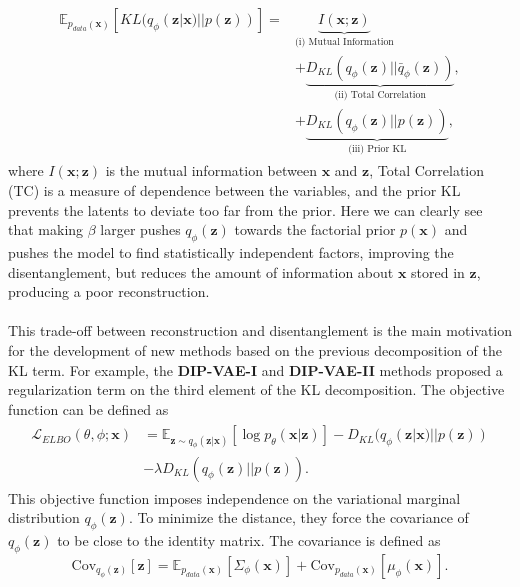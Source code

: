 \begin{align}
\begin{split}
    \mathbb{E}_{p_{data}(\mathbf{x})}\left[ KL(q_{\phi}(\mathbf{z}|\mathbf{x})||p(\mathbf{z})) \right] = &\underbrace{I(\mathbf{x};\mathbf{z})}_{\text{(i) Mutual Information}} \\
    & + \underbrace{D_{KL}(q_{\phi}(\mathbf{z})||\bar q_{\phi}(\mathbf{z}))}_{\text{(ii) Total Correlation}}, \\
    & + \underbrace{D_{KL}(q_{\phi}(\mathbf{z})||p(\mathbf{z}))}_{\text{(iii) Prior KL}},
\end{split}
\end{align}
where $I(\mathbf{x};\mathbf{z})$ is the mutual information between $\mathbf{x}$ and $\mathbf{z}$, Total Correlation (TC) is a measure of dependence between the variables, and the prior KL prevents 
the latents to deviate too far from the prior. Here we can clearly see that making $\beta$ larger pushes $q_{\phi}(\mathbf{z})$ towards the factorial prior $p(\mathbf{x})$ and pushes the model to find
statistically independent factors, improving the disentanglement, but reduces the amount of information about $\mathbf{x}$ stored in $\mathbf{z}$, producing a poor reconstruction. \\ 
\\
This trade-off between reconstruction and disentanglement is the main motivation for the development of new methods based on the previous decomposition of the KL term. For example, the 
\textbf{DIP-VAE-I} and \textbf{DIP-VAE-II} \cite{kumar2018variationalinferencedisentangledlatent} methods proposed a regularization term on the third element of the KL decomposition.
The objective function can be defined as 
\begin{align}
\begin{split}
    \mathcal{L}_{ELBO}(\theta,\phi;\mathbf{x}) &= \mathbb{E}_{\mathbf{z}\sim q_{\phi}(\mathbf{z}|\mathbf{x})}\left[\log p_{\theta}(\mathbf{x}|\mathbf{z})\right] - D_{KL}(q_{\phi}(\mathbf{z}|\mathbf{x})||p(\mathbf{z})) \\
    &- \lambda D_{KL}(q_{\phi}(\mathbf{z})||p(\mathbf{z})).
\end{split}
\end{align}
This objective function imposes independence on the variational marginal distribution $q_{\phi}(\mathbf{z})$. To minimize the distance, they force the covariance of $q_{\phi}(\mathbf{z})$ to be close to the identity matrix. 
The covariance is defined as 
\begin{equation}
    \text{Cov}_{q_{\phi}(\mathbf{z})}[\mathbf{z}] = \mathbb{E}_{p_{data}(\mathbf{x})}\left[ \Sigma_{\phi}(\mathbf{x}) \right] + \text{Cov}_{p_{data}(\mathbf{x})}\left[ \mu_{\phi}(\mathbf{x}) \right].
\end{equation}
